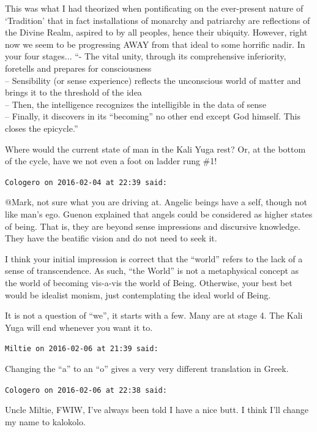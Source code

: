 \begin{footnotesize}
\begin{sffamily}
This was what I had theorized when pontificating on the ever-present nature of `Tradition' that in fact installations of monarchy and patriarchy are reflections of the Divine Realm, aspired to by all peoples, hence their ubiquity. However, right now we seem to be progressing AWAY from that ideal to some horrific nadir. In your four stages... ``- The vital unity, through its comprehensive inferiority, foretells and prepares for consciousness\\ -- Sensibility (or sense experience) reflects the unconscious world of matter and brings it to the threshold of the idea\\ -- Then, the intelligence recognizes the intelligible in the data of sense\\ -- Finally, it discovers in its ``becoming'' no other end except God himself. This closes the epicycle.''

Where would the current state of man in the Kali Yuga rest? Or, at the bottom of the cycle, have we not even a foot on ladder rung \#1!

\hfill

\texttt{Cologero on 2016-02-04 at 22:39 said:}

@Mark, not sure what you are driving at. Angelic beings have a self, though not like man's ego. Guenon explained that angels could be considered as higher states of being. That is, they are beyond sense impressions and discursive knowledge. They have the beatific vision and do not need to seek it.

I think your initial impression is correct that the ``world'' refers to the lack of a sense of transcendence. As such, ``the World'' is not a metaphysical concept as the world of becoming vis-a-vis the world of Being. Otherwise, your best bet would be idealist monism, just contemplating the ideal world of Being.

It is not a question of ``we'', it starts with a few. Many are at stage 4. The Kali Yuga will end whenever you want it to.

\hfill

\texttt{Miltie on 2016-02-06 at 21:39 said:}

Changing the ``a'' to an ``o'' gives a very very different translation in Greek.

\hfill

\texttt{Cologero on 2016-02-06 at 22:38 said:}

Uncle Miltie, FWIW, I've always been told I have a nice butt. I think I'll change my name to kalokolo.

\end{sffamily}
\end{footnotesize}

